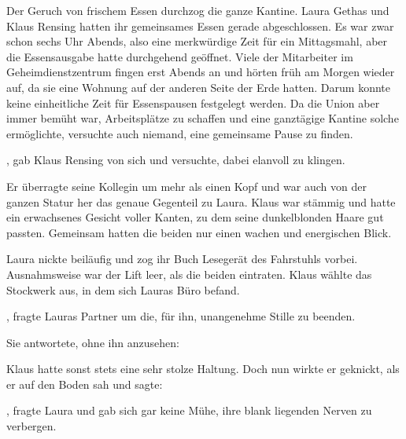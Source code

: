 Der Geruch von frischem Essen durchzog die ganze Kantine.
Laura Gethas und Klaus Rensing hatten ihr gemeinsames Essen gerade abgeschlossen.
Es war zwar schon sechs Uhr Abends, also eine merkwürdige Zeit für ein Mittagsmahl, aber die Essensausgabe hatte durchgehend geöffnet.
Viele der Mitarbeiter im Geheimdienstzentrum fingen erst Abends an und hörten früh am Morgen wieder auf, da sie eine Wohnung auf der anderen Seite der Erde hatten.
Darum konnte keine einheitliche Zeit für Essenspausen festgelegt werden.
Da die Union aber immer bemüht war, Arbeitsplätze zu schaffen und eine ganztägige Kantine solche ermöglichte, versuchte auch niemand, eine gemeinsame Pause zu finden.

\par

, gab Klaus Rensing von sich und versuchte, dabei elanvoll zu klingen.

\par

Er überragte seine Kollegin um mehr als einen Kopf und war auch von der ganzen Statur her das genaue Gegenteil zu Laura.
Klaus war stämmig und hatte ein erwachsenes Gesicht voller Kanten, zu dem seine dunkelblonden Haare gut passten.
Gemeinsam hatten die beiden nur einen wachen und energischen Blick.

\par

Laura nickte beiläufig und zog ihr Buch Lesegerät des Fahrstuhls vorbei.
Ausnahmsweise war der Lift leer, als die beiden eintraten.
Klaus wählte das Stockwerk aus, in dem sich Lauras Büro befand.

\par

, fragte Lauras Partner um die, für ihn, unangenehme Stille zu beenden.

\par

Sie antwortete, ohne ihn anzusehen: 

\par

Klaus hatte sonst stets eine sehr stolze Haltung.
Doch nun wirkte er geknickt, als er auf den Boden sah und sagte: 

\par

, fragte Laura und gab sich gar keine Mühe, ihre blank liegenden Nerven zu verbergen.

